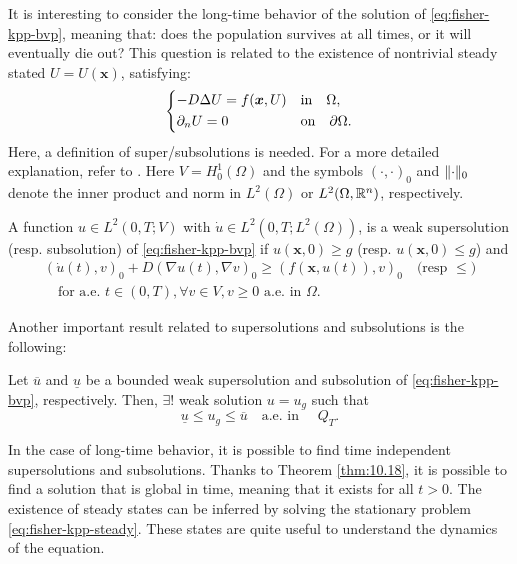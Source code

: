 It is interesting to consider the long-time behavior of the solution of \eqref{eq:fisher-kpp-bvp}, meaning that: does the population survives at all times, or it will eventually die out? This question is related to the existence of nontrivial steady stated \(U = U(\bm{x})\), satisfying:
\begin{equation}
    \begin{dcases}
        -D \Delta U = f(\bm{x}, U) & \text{in} \quad \Omega, \\
        \partial_{n}U = 0 & \text{on} \quad \partial \Omega.
    \end{dcases}
    \label{eq:fisher-kpp-steady} 
\end{equation}
Here, a definition of super/subsolutions is needed. For a more detailed explanation, refer to \cite{SalsaVerziniPDE}. Here \(V = H^1_0(\Omega)\) and the symbols \(\left(\cdot, \cdot\right)_0\) and \(\lVert\cdot\rVert_0\) denote the inner product and norm in \(L^2(\Omega)\) or \(L^2(\Omega, \mathbb{R}^n)\), respectively. 
\begin{definition}
    A function \(u \in L^2(0, T; V)\) with \(\dot{u} \in L^2(0, T; L^2(\Omega))\), is a weak supersolution (resp. subsolution) of \eqref{eq:fisher-kpp-bvp} if \(u(\bm{x}, 0) \geq g\) (resp. \(u(\bm{x}, 0) \leq g\)) and
    \begin{equation}
        \begin{split}
            \left(\dot{u}(t), v\right)_0 + D \left(\nabla u(t), \nabla v\right)_0 \geq (f(\bm{x}, u(t)), v)_0 \quad \text{(resp } \leq \text{)} \\ \quad \text{for a.e. } t \in (0, T), \forall v \in V, v \geq 0 \text{ a.e. in } \Omega.
        \end{split}
    \end{equation}
\end{definition}
Another important result related to supersolutions and subsolutions is the following:
\begin{theorem}
    Let \(\overline{u}\) and \(\underline{u}\) be a bounded weak supersolution and subsolution of \eqref{eq:fisher-kpp-bvp}, respectively. Then, \(\exists!\) weak solution \(u = u_g\) such that
    \begin{equation}
        \underline{u} \leq u_g \leq \overline{u} \quad \text{a.e. in } \quad Q_T.
    \end{equation}
    \label{thm:10.18}
\end{theorem}

In the case of long-time behavior, it is possible to find time independent supersolutions and subsolutions. Thanks to Theorem \ref{thm:10.18}, it is possible to find a solution that is global in time, meaning that it exists for all \(t > 0\). 
The existence of steady states can be inferred by solving the stationary problem \eqref{eq:fisher-kpp-steady}. These states are quite useful to understand the dynamics of the equation.


